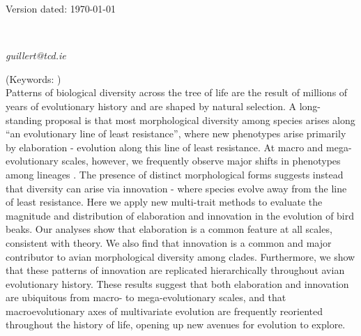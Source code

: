 \documentclass[12pt,letterpaper]{article}
\begin{document}
\begin{flushright}
Version dated: \today
\end{flushright}

\bigskip
\medskip
\begin{center}

\bigskip

\\


\end{center}
\medskip
{} \textit{guillert@tcd.ie}\\ 
\vspace{1in}

\modulolinenumbers[1]
\linenumbers

%
%

\noindent (Keywords: )\\

Patterns of biological diversity across the tree of life are the result of millions of years of evolutionary history and are shaped by natural selection.
A long-standing proposal is that most morphological diversity among species arises along ``an evolutionary line of least resistance'', where new phenotypes arise primarily by elaboration - evolution along this line of least resistance.
At macro and mega-evolutionary scales, however, we frequently observe major shifts in phenotypes among lineages \cite{venditti2011multiple, pagel2022general}.
The presence of distinct morphological forms suggests instead that diversity can arise via innovation - where species evolve away from the line of least resistance.
Here we apply new multi-trait methods to evaluate the magnitude and distribution of elaboration and innovation in the evolution of bird beaks.
Our analyses show that elaboration is a common feature at all scales, consistent with theory.
We also find that innovation is a common and major contributor to avian morphological diversity among clades.
Furthermore, we show that these patterns of innovation are replicated hierarchically throughout avian evolutionary history.
These results suggest that both elaboration and innovation are ubiquitous from macro- to mega-evolutionary scales, and that macroevolutionary axes of multivariate evolution are frequently reoriented throughout the history of life, opening up new avenues for evolution to explore.
\end{document}
